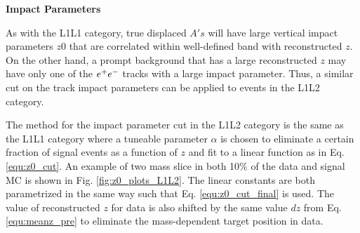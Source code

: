 
\clearpage

\textbf{Impact Parameters}

As with the L1L1 category, true displaced $A's$ will have large vertical impact parameters $z0$ that are correlated within well-defined band with reconstructed $z$. On the other hand, a prompt background that has a large reconstructed $z$ may have only one of the $e^{+}e^{-}$ tracks with a large impact parameter. Thus, a similar cut on the track impact parameters can be applied to events in the L1L2 category. 

The method for the impact parameter cut in the L1L2 category is the same as the L1L1 category where a tuneable parameter $\alpha$ is chosen to eliminate a certain fraction of signal events as a function of $z$ and fit to a linear function as in Eq. \ref{equ:z0_cut}. An example of two mass slice in both 10\% of the data and signal MC is shown in Fig. \ref{fig:z0_plots_L1L2}. The linear constants are both parametrized in the same way such that Eq. \ref{equ:z0_cut_final} is used. The value of reconstructed $z$ for data is also shifted by the same value $dz$ from Eq. \ref{equ:meanz_pre} to eliminate the mass-dependent target position in data.

